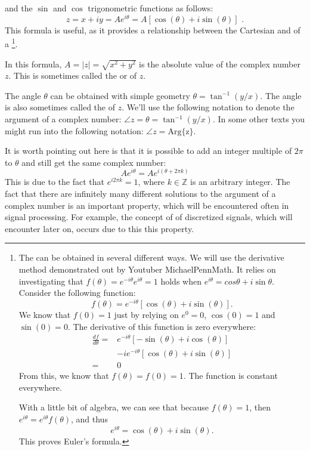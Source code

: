 and the $\sin$ and $\cos$ trigonometric functions as follows:
\begin{equation}
  \boxed{
    z = x + iy = A e^{i\theta} = A[\cos(\theta)+i\sin(\theta)]
  }\,\,.
  \label{eq:eulerintro}
\end{equation}
This formula is useful, as it provides a relationship between the Cartesian and  of a \footnote{The \emph{} can be obtained in several different ways. We will use the derivative method demonstrated out by Youtuber MichaelPennMath. It relies on investigating that $f(\theta)=e^{-i\theta}e^{i\theta}=1$ holds when $e^{i\theta}=cos\theta + i\sin\theta$. Consider the following function:
\[
f(\theta) = e^{-i\theta}[\cos(\theta)+i\sin(\theta)].
\]
We know that $f(0)=1$ just by relying on $e^0=0$, $\cos(0)=1$ and $\sin(0)=0$. The derivative of this function is zero everywhere:
\begin{align*}
\frac{df}{d\theta} =& e^{-i\theta}[-\sin(\theta)+i\cos(\theta)] \\
&- i e^{-i\theta}[\cos(\theta)+i\sin(\theta)] \\
= & 0
\end{align*}
From this, we know that $f(\theta) = f(0) = 1$. The function is constant everywhere.

With a little bit of algebra, we can see that because $f(\theta)=1$, then $e^{i\theta}=e^{i\theta} f(\theta)$, and thus
\[
e^{i\theta} = \cos(\theta) + i\sin(\theta).
\]
This proves Euler's formula.}.



In this formula, $A = |z|=\sqrt{x^2 + y^2}$ is the absolute value of the complex number $z$. This is sometimes called the \emph{} or
\emph{} of $z$.

The angle $\theta$ can be obtained with simple geometry
$\theta=\tan^{-1}(y/x)$. The angle is also sometimes called the \emph{} of $z$. We'll use the following notation to denote the argument of a complex number: $\angle z = \theta = \tan^{-1}(y/x)$. In some other texts you might run into the following notation: $\angle z = \mathrm{Arg\{z\}}$.

It is worth pointing out here is that it is possible to add an integer
multiple of $2\pi$ to $\theta$ and still get the same complex number:
\begin{equation}
  A e^{i\theta} = A e^{i(\theta + 2\pi k)}
\end{equation}
This is due to the fact that $e^{i2\pi k} = 1$, where
$k \in \mathbb{Z}$ is an arbitrary integer. The fact that there are
infinitely many different solutions to the argument of a complex
number is an important property, which will be encountered often in
signal processing. For example, the concept
of \emph{} of discretized signals, which will
encounter later on, occurs due to this this property.

